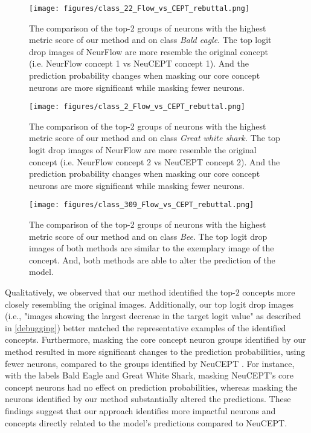 \begin{figure}[tbh]
    \centering
    \texttt{[image: figures/class\_22\_Flow\_vs\_CEPT\_rebuttal.png]}
    \caption{{The comparison of the top-2 groups of neurons with the highest metric score of our method and \citet{NEUCEPT} on class \textit{Bald eagle}. The top logit drop images of NeurFlow are more resemble the original concept (i.e. NeurFlow concept 1 vs NeuCEPT concept 1). And the prediction probability changes when masking our core concept neurons are more significant while masking fewer neurons.}}
    \label{fig:compare_neucept_22}
\end{figure}
\begin{figure}[H]
    \centering
    \texttt{[image: figures/class\_2\_Flow\_vs\_CEPT\_rebuttal.png]}
    \caption{{The comparison of the top-2 groups of neurons with the highest metric score of our method and \citet{NEUCEPT} on class \textit{Great white shark.} The top logit drop images of NeurFlow are more resemble the original concept (i.e. NeurFlow concept 2 vs NeuCEPT concept 2). And the prediction probability changes when masking our core concept neurons are more significant while masking fewer neurons.}}
    \label{fig:compare_neucept_2}
\end{figure}
\begin{figure}[H]
    \centering
    \texttt{[image: figures/class\_309\_Flow\_vs\_CEPT\_rebuttal.png]}
    \caption{{The comparison of the top-2 groups of neurons with the highest metric score of our method and \citet{NEUCEPT} on class \textit{Bee}. The top logit drop images of both methods are similar to the exemplary image of the concept. And, both methods are able to alter the prediction of the model.}}
    \label{fig:compare_neucept_309}
\end{figure}

{Qualitatively, we observed that our method identified the top-$2$ concepts more closely resembling the original images. Additionally, our top logit drop images (i.e., "images showing the largest decrease in the target logit value" as described in \ref{debugging}) better matched the representative examples of the identified concepts. Furthermore, masking the core concept neuron groups identified by our method resulted in more significant changes to the prediction probabilities, using fewer neurons, compared to the groups identified by NeuCEPT \citep{NEUCEPT}. For instance, with the labels Bald Eagle and Great White Shark, masking NeuCEPT’s core concept neurons had no effect on prediction probabilities, whereas masking the neurons identified by our method substantially altered the predictions. These findings suggest that our approach identifies more impactful neurons and concepts directly related to the model’s predictions compared to NeuCEPT.}

